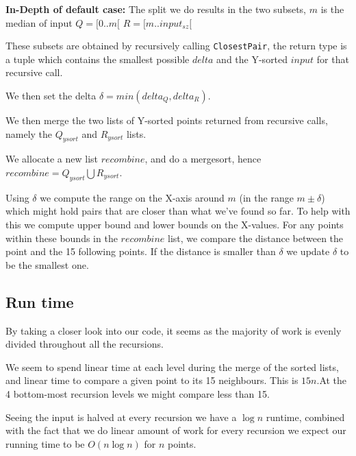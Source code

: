 \documentclass{tufte-handout}
\begin{document}
\bigskip
\textbf{In-Depth of default case:}\newline
The split we do results in the two subsets, $m$ is the median of input\newline
  $Q = \lbrack 0 .. m \lbrack $\newline
  $R = \lbrack m .. input_{sz} \lbrack$ \newline 

These subsets are obtained by recursively calling \verb+ClosestPair+, the return type 
is a tuple which contains the smallest possible $delta$ and the Y-sorted $input$ for that recursive call.

We then set the delta $\delta = min(delta_{Q}, delta_{R})$.\newline

We then merge the two lists of Y-sorted points returned from recursive calls, namely the $Q_{ysort}$ and $R_{ysort}$ lists.

We allocate a new list $recombine$, and do a mergesort, hence\newline $recombine = Q_{y sort} \bigcup R_{y sort}$.
\newline

Using $\delta$ we compute the range on the X-axis around $m$ (in the range $m \pm \delta$) which 
might hold pairs that are closer than what we've found so far.
To help with this we compute upper bound and lower bounds on the X-values.\newline
For any points within these bounds in the $recombine$ list, we compare the distance between the point
 and the 15 following points.
If the distance is smaller than $\delta$ we update $\delta$ to be the smallest one.

\subsection{Run time}
By taking a closer look into our code, it seems as the majority of work is evenly divided throughout all the recursions.

We seem to spend linear time at each level during the merge of the sorted lists, and linear time to 
compare a given point to its 15 neighbours.
This is $15n$.\newline At the 4 bottom-most recursion levels we might compare less than 15.

Seeing the input is halved at every recursion we have a $\log n$ runtime, combined with the fact that we 
do linear amount of work for every recursion we expect our running time to be $O(n\log n)$ for $n$ points.
\end{document}
